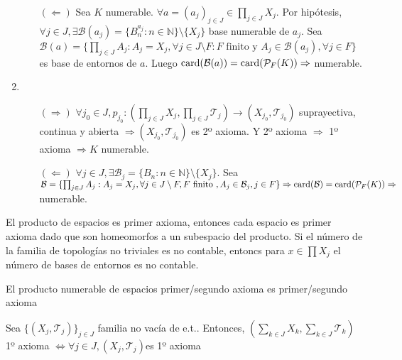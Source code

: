 \begin{dem}
\begin{enumerate}[label=(\roman*)]
\begin{enumerate}[label=(\roman*)]
      \item [$(\Leftarrow)$] Sea $K$ numerable. $\forall a = ( a_{j} )_{j \in J} \in \prod_{j \in J} X_{j}$. Por hipótesis, $\forall j \in J, \exists \mathcal{B} (a_{j}) = \{  B_{n}^{a_{j}} : n \in \mathbb{N} \} \setminus \{  X_{j} \}$ base numerable de $a_{j}$. Sea $\mathcal{B} (a) = \{ \prod_{j \in J} A_{j} : A_{j} = X_{j}, \forall j \in J \setminus F : F \text{ finito y } A_{j} \in \mathcal{B}(a_{j}), \forall j \in F \}$ es base de entornos de $ a$. Luego $\operatorname{card}(\mathcal{B} (a)) = \operatorname{card}( \mathcal{P}_{F}(K)) \Rightarrow$ numerable.
    \end{enumerate}
    \item \begin{enumerate}[label=(\roman*)]
      \item []
      \item [$(\Rightarrow)$] $\forall j_{0} \in J, p_{j_{0}} : ( \prod_{j \in J} X_{j}, \prod_{j \in J} \mathcal{T}_{j} ) \to ( X_{j_{0}}, \mathcal{T}_{j_{0}} )$ suprayectiva, continua y abierta $\Rightarrow ( X_{j_{0}}, \mathcal{T}_{j_{0}} )$ es 2º axioma. Y 2º axioma $\Rightarrow$ 1º axioma $\Rightarrow K$ numerable.
      \item [$(\Leftarrow)$] $\forall j \in J, \exists \mathcal{B}_{j} = \{ B_{n} : n \in \mathbb{N} \} \setminus \{ X_{j} \}$. Sea $\mathcal{B} = \{  \prod_{j \in J} A_{j}: A_{j} = X_{j}, \forall j \in J \setminus F, F \text{ finito }, A_{j} \in \mathcal{B}_{j}, j \in F \} \Rightarrow \operatorname{card}(\mathcal{B}) = \operatorname{card}(\mathcal{P}_{F}(K)) \Rightarrow $ numerable.
    \end{enumerate}
  \end{enumerate}
\end{dem}

\begin{obs}
  El producto de espacios es primer axioma, entonces cada espacio es primer axioma dado que son homeomorfos a un subespacio del producto. Si el número de la familia de topologías no triviales es no contable, entoncs para $x \in \prod X_{j}$ el número de bases de entornos es no contable.
\end{obs}

\begin{obs}
  El producto numerable de espacios primer/segundo axioma es primer/segundo axioma
\end{obs}

\begin{prop}
  Sea $\{ ( X_{j}, \mathcal{T}_{j} ) \}_{j \in J}$ familia no vacía de e.t.. Entonces, $( \sum_{k \in J} X_{k}, \sum_{k \in J} \mathcal{T}_{k})$ 1º axioma $\Leftrightarrow \forall j \in J, ( X_{j}, \mathcal{T}_{j} )$es 1º axioma
\end{prop}

